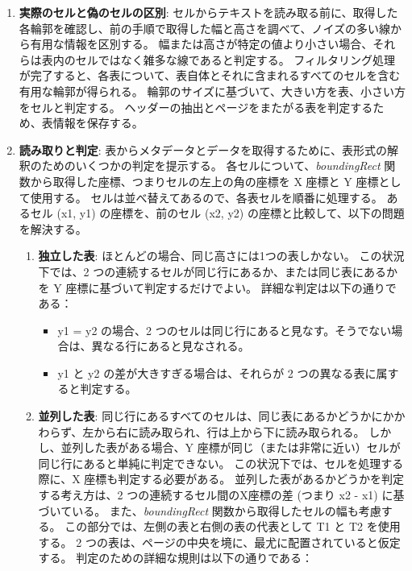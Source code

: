 \documentclass[uplatex, twocolumn,10pt]{jsarticle}
\begin{document}
\begin{enumerate}
    \item \textbf{実際のセルと偽のセルの区別}:
    セルからテキストを読み取る前に、取得した各輪郭を確認し、前の手順で取得した幅と高さを調べて、ノイズの多い線から有用な情報を区別する。
    幅または高さが特定の値より小さい場合、それらは表内のセルではなく雑多な線であると判定する。
    フィルタリング処理が完了すると、各表について、表自体とそれに含まれるすべてのセルを含む有用な輪郭が得られる。
    輪郭のサイズに基づいて、大きい方を表、小さい方をセルと判定する。
    ヘッダーの抽出とページをまたがる表を判定するため、表情報を保存する。
    \item \textbf{読み取りと判定}:
    表からメタデータとデータを取得するために、表形式の解釈のためのいくつかの判定を提示する。
    各セルについて、\textit{boundingRect} 関数から取得した座標、つまりセルの左上の角の座標を X 座標と Y 座標として使用する。
    セルは並べ替えてあるので、各表セルを順番に処理する。
    あるセル (x1, y1) の座標を、前のセル (x2, y2) の座標と比較して、以下の問題を解決する。
    \begin{enumerate}
        \item \textbf{独立した表}:
        ほとんどの場合、同じ高さには1つの表しかない。
        この状況下では、2 つの連続するセルが同じ行にあるか、または同じ表にあるかを Y 座標に基づいて判定するだけでよい。
        詳細な判定は以下の通りである：
        \begin{itemize}
            \item y1 = y2 の場合、2 つのセルは同じ行にあると見なす。そうでない場合は、異なる行にあると見なされる。
            \item y1 と y2 の差が大きすぎる場合は、それらが 2 つの異なる表に属すると判定する。
        \end{itemize}
        \item \textbf{並列した表}:
        同じ行にあるすべてのセルは、同じ表にあるかどうかにかかわらず、左から右に読み取られ、行は上から下に読み取られる。
        しかし、並列した表がある場合、Y 座標が同じ（または非常に近い）セルが同じ行にあると単純に判定できない。
        この状況下では、セルを処理する際に、X 座標も判定する必要がある。
        並列した表があるかどうかを判定する考え方は、2 つの連続するセル間のX座標の差 (つまり x2 - x1) に基づいている。
        また、\textit{boundingRect} 関数から取得したセルの幅も考慮する。
        この部分では、左側の表と右側の表の代表として T1 と T2 を使用する。
        2 つの表は、ページの中央を境に、最尤に配置されていると仮定する。
        判定のための詳細な規則は以下の通りである：

\end{enumerate}
\end{enumerate}
\end{document}
